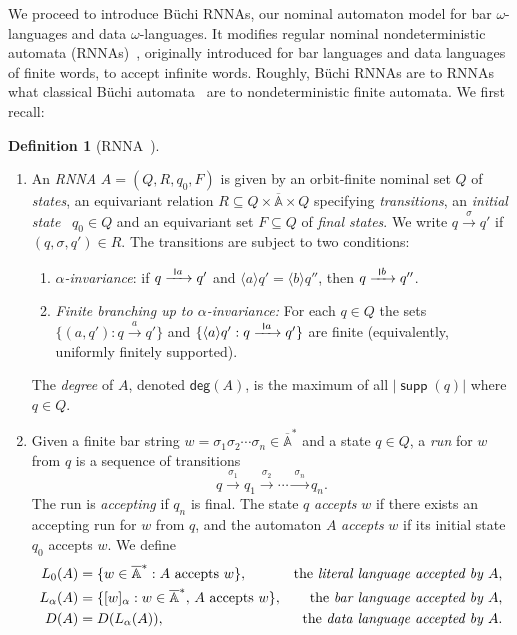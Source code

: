 \documentclass[10pt,a4paper]{amsart}
\newcommand{\scriptmidmid}{\hspace{0.2ex}{\rule[-0.1ex]{0.6pt}{1.1ex}}\hspace{0.2ex}}
\newcommand{\compr}{:}
\newcommand{\scriptnew}[1]{{\scriptmidmid}#1}
\newcommand{\degree}{\mathsf{deg}}
\newcommand{\barA}{\overline{\names}}
\numberwithin{equation}{section}
\newcommand{\xto}[1]{\xrightarrow{~#1~}}
\newcommand{\seq}{\subseteq}
\newcommand{\braket}[1]{\langle #1 \rangle}
\newcommand{\+}[1]{\mathcal{#1}\xspace}
\newcommand{\names}{\mathbb{A}}
\DeclareMathOperator{\supp}{\mathsf{supp}} %
\theoremstyle{definition}
\newtheorem{defn}[theorem]{Definition}
\begin{document}
We proceed to introduce {Büchi RNNAs}, our nominal automaton model for bar $\omega$-languages and data $\omega$-languages. It modifies regular nominal nondeterministic automata
(RNNAs)~\cite{SchroderEA17}, originally introduced for bar languages and data languages of finite words, to accept infinite words. Roughly, Büchi RNNAs are to RNNAs what classical Büchi automata~\cite{GraedelThomasWilke02} are to nondeterministic finite automata. We first recall:
%
\begin{defn}[RNNA~\cite{SchroderEA17}]
\begin{enumerate}
\item  An \emph{RNNA} $A=(Q,R,q_0,F)$ is given by an orbit-finite nominal set $Q$
  of \emph{states}, an equivariant relation
  $R\seq Q\times \barA \times Q$ specifying \emph{transitions}, an
  \emph{initial state}~ $q_0\in Q$ and an equivariant set $F\seq Q$ of
  \emph{final states}. We write $q\xto{\sigma}q'$ if
  $(q,\sigma,q')\in R$. The transitions are subject to two conditions:
  \begin{enumerate}[(1)]
  \item \emph{$\alpha$-invariance}: if $q\xto{\scriptnew a}q'$ and
    $\braket{a} q'=\braket{b} q''$, then $q\xto{\scriptnew b}q''$.
    
  \item \emph{Finite branching up to $\alpha$-invariance:} For each $q\in Q$ the sets $\{ (a,q') \compr q\xto{a}q'\}$ and
    $\{ \braket{a} q' \compr q\xto{\scriptnew a} q' \}$ are finite (equivalently, uniformly finitely supported).
  \end{enumerate}
  The \emph{degree} of $A$, denoted $\degree(A)$, is the maximum of
  all $|\supp(q)|$ where $q\in Q$.
\item  Given a finite bar string
    $w=\sigma_1\sigma_2\cdots \sigma_n\in \barA^*$ and a state $q\in Q$, a \emph{run} for
    $w$ from $q$ is a sequence of transitions 
    \[
      q\xto{\sigma_1}q_1\xto{\sigma_2}\cdots \xto{\sigma_n}q_n.
    \]
    The run is \emph{accepting} if $q_n$ is final. The state $q$ \emph{accepts} $w$ if there exists an accepting run for $w$ from $q$, and the automaton $A$ \emph{accepts} $w$ if its initial state $q_0$ accepts $w$.
    We define
    \begin{align*}
      L_0(A)
      & = \{w\in \barA^*\compr \text{$A$ accepts $w$}\},
      & \text{the \emph{literal language accepted by $A$},}
      \\
      L_{\alpha}(A)
      & = \{ [w]_\alpha \compr w\in \barA^*, \, \text{$A$ accepts $w$} \},
      & \text{the \emph{bar language accepted by $A$},}
      \\
      D(A)
      & = D(L_{\alpha}(A)),& \text{the \emph{data language accepted by $A$}}. 
    \end{align*}
\end{enumerate}
\end{defn}
\end{document}
